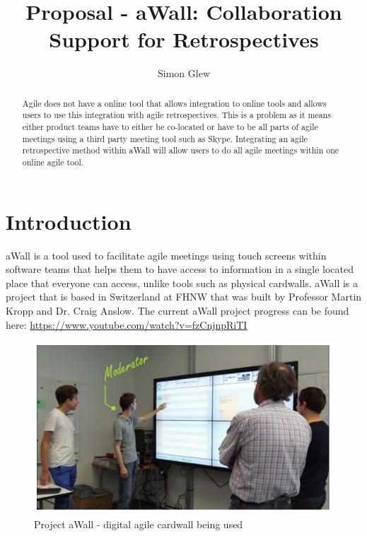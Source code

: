 \documentclass[11pt, a4paper, twoside, openright]{report}
\title{Proposal - aWall: Collaboration Support for Retrospectives}
\author{Simon Glew}
\date{}
\begin{document}
\frontmatter


\begin{abstract}
Agile does not have a online tool that allows integration to online tools and allows users to use this integration with agile retrospectives. 
This is a problem as it means either product teams have to either be co-located or have to be all parts of agile meetings using a third party meeting tool such as Skype. 
Integrating an agile retrospective method within aWall will allow users to do all agile meetings within one online agile tool.  

\end{abstract}


\maketitle




\mainmatter


\section*{Introduction} 

aWall is a tool used to facilitate agile meetings using touch screens within software teams that helps them to have access to information in a single located place that everyone can access, unlike tools such as physical cardwalls. aWall is a project that is based in Switzerland at FHNW that was built by Professor Martin Kropp and Dr. Craig Anslow. The current aWall project progress can be found here: \url{https://www.youtube.com/watch?v=fzCnjnpRiTI}

\begin{figure}[h]
\centering
\includegraphics{aWall_introduction}
\caption{Project aWall - digital agile cardwall being used}
\end{figure}
\end{document}
